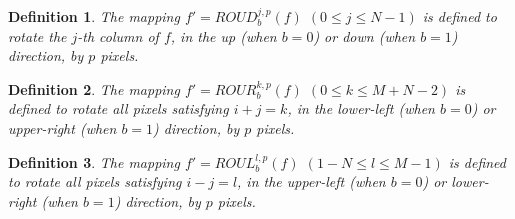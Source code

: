 \documentclass[final,3p,times,twocolumn]{elsarticle}
\newtheorem{definition}{Definition}
\begin{document}
\begin{definition}
The mapping $f'=ROUD^{j,p}_b(f)$ $(0\leq j\leq N-1)$ is defined to
rotate the $j$-th column of $f$, in the up (when $b=0$) or down
(when $b=1$) direction, by $p$ pixels.
\end{definition}

\begin{definition}
The mapping $f'=ROUR^{k,p}_b(f)$ $(0 \leq k \leq M+N-2)$ is
defined to rotate all pixels satisfying $i+j=k$, in the lower-left
(when $b=0$) or upper-right (when $b=1$) direction, by $p$ pixels.
\end{definition}

\begin{definition}
The mapping $f'=ROUL^{l,p}_b(f)$ $(1-N \leq l \leq M-1)$ is
defined to rotate all pixels satisfying $i-j=l$, in the upper-left
(when $b=0$) or lower-right (when $b=1$) direction, by $p$ pixels.
\end{definition}
\end{document}
